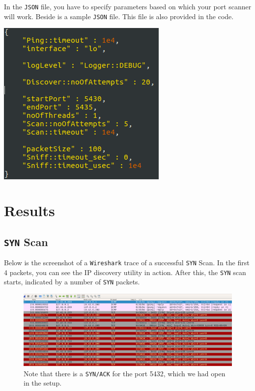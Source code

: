 \documentclass[12pt]{article}
\begin{document}
\begin{minipage}{0.475\linewidth}
In the \texttt{JSON} file, you have to specify parameters based on which your port scanner will work. Beside is a sample \texttt{JSON} file. This file is also provided in the code.
\end{minipage}
\hfill
\begin{minipage}{0.475\linewidth}
\centering
\includegraphics[width=0.9\linewidth]{sample-json.png}
\end{minipage}
\section{Results}

\subsection{\texttt{SYN} Scan}
Below is the screenshot of a \texttt{Wireshark} trace of a successful \texttt{SYN} Scan. In the first 4 packets, you can see the IP discovery utility in action. After this, the \texttt{SYN} scan starts, indicated by a number of \texttt{SYN} packets.

\begin{figure}[H]
\centering
\includegraphics[width=0.75\linewidth]{syn-scan-wireshark.png}
\caption{Note that there is a \texttt{SYN/ACK} for the port 5432, which we had open in the setup.}
\end{figure}
\end{document}
